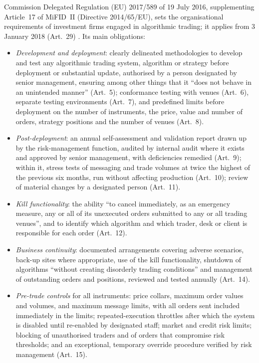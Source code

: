 \begin{qfrule}\label{rule:mifid-rts6-algorithmic-controls}
 Commission Delegated Regulation (EU) 2017/589 of 19 July 2016, supplementing Article~17 of MiFID~II (Directive 2014/65/EU), sets the organisational requirements of investment firms engaged in algorithmic trading; it applies from 3 January 2018 (Art.~29) \citep[OJ L 87, 31.3.2017, pp.~417ff.]{wide-mifid-rts6}. Its main obligations:
\begin{itemize}
\item \emph{Development and deployment}: clearly delineated methodologies to develop and test any algorithmic trading system, algorithm or strategy before deployment or substantial update, authorised by a person designated by senior management, ensuring among other things that it ``does not behave in an unintended manner'' (Art.~5); conformance testing with venues (Art.~6), separate testing environments (Art.~7), and predefined limits before deployment on the number of instruments, the price, value and number of orders, strategy positions and the number of venues (Art.~8).
\item \emph{Post-deployment}: an annual self-assessment and validation report drawn up by the risk-management function, audited by internal audit where it exists and approved by senior management, with deficiencies remedied (Art.~9); within it, stress tests of messaging and trade volumes at twice the highest of the previous six months, run without affecting production (Art.~10); review of material changes by a designated person (Art.~11).
\item \emph{Kill functionality}: the ability ``to cancel immediately, as an emergency measure, any or all of its unexecuted orders submitted to any or all trading venues'', and to identify which algorithm and which trader, desk or client is responsible for each order (Art.~12).
\item \emph{Business continuity}: documented arrangements covering adverse scenarios, back-up sites where appropriate, use of the kill functionality, shutdown of algorithms ``without creating disorderly trading conditions'' and management of outstanding orders and positions, reviewed and tested annually (Art.~14).
\item \emph{Pre-trade controls} for all instruments: price collars, maximum order values and volumes, and maximum message limits, with all orders sent included immediately in the limits; repeated-execution throttles after which the system is disabled until re-enabled by designated staff; market and credit risk limits; blocking of unauthorised traders and of orders that compromise risk thresholds; and an exceptional, temporary override procedure verified by risk management (Art.~15).

\end{itemize}
\end{qfrule}

